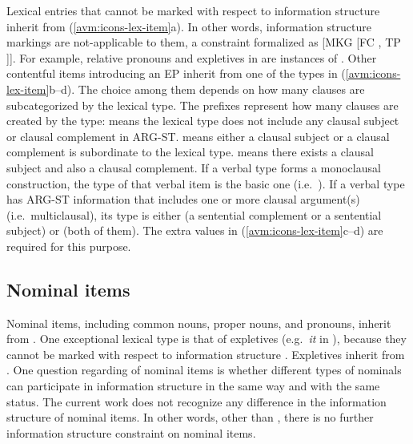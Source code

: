 Lexical entries that cannot be marked with respect to information
structure inherit from 
(\ref{avm:icons-lex-item}a). In other words, information structure
markings are not-applicable to them, a constraint formalized as [MKG
  [FC , TP ]]. For
example, relative pronouns and expletives in  are
instances of .  Other contentful items
introducing an EP inherit from one of the types in
(\ref{avm:icons-lex-item}b--d). The choice among them depends on how
many clauses are subcategorized by the lexical type.  The prefixes
represent how many clauses are created by the type:  means
the lexical type does not include any clausal subject or clausal
complement in ARG-ST.  means either a clausal subject or a
clausal complement is subordinate to the lexical type. 
means there exists a clausal subject and also a clausal complement.
If a verbal type forms a monoclausal construction, the
 type of that verbal item is the basic one
(i.e.\ ).  If a verbal type has ARG-ST
information that includes one or more clausal argument(s)
(i.e.\ multiclausal), its  type is either
 (a sentential complement or a sentential
subject) or  (both of them).  The extra
 values in (\ref{avm:icons-lex-item}c--d) are required
for this purpose.



\subsection{Nominal items}
\label{10:ssec:nominal}

Nominal items, including common nouns, proper nouns, and pronouns,
inherit from .  One exceptional lexical type
is that of expletives (e.g.\ \textit{it} in ), because
they cannot be marked with respect to information structure
\citep{lambrecht:96}.  Expletives inherit from
.  One question regarding  of
nominal items is whether different types of nominals can participate
in information structure in the same way and with the same status. The
current work does not recognize any difference in the information
structure of nominal items.  In other words, other than
, there is no further information structure
constraint on nominal items.


